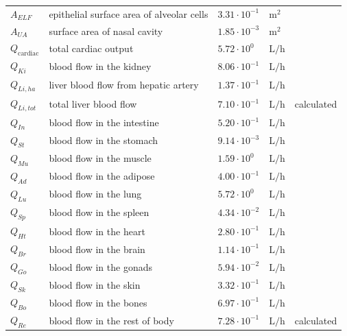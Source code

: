\documentclass[preprint,12pt,authoryear]{elsarticle}
\begin{document}
\begin{longtable}{P{2cm}P{3.5cm}P{2cm}P{1cm}P{2.5cm}}
$A_{ELF}$  & epithelial surface area of alveolar cells    & $3.31 \cdot 10^{-1}$ & $\text{m}^2$ &\citep{stone_1992} \\
$A_{UA}$  & surface area of nasal cavity    & $1.85 \cdot 10^{-3}$ & $\text{m}^2$ &\citep{oller_2010} \\

\midrule\midrule


$Q_{\text{cardiac}}$ & total cardiac output & $5.72 \cdot 10^{0}$ & $\text{L}/\text{h}$ & \citep{brown_1997} \\
$Q_{Ki}$ & blood flow in the kidney & $8.06 \cdot 10^{-1}$ & $\text{L}/\text{h}$ & \citep{brown_1997} \\
$Q_{Li,ha}$ & liver blood flow from hepatic artery & $1.37 \cdot 10^{-1}$ & $\text{L}/\text{h}$ & \citep{brown_1997} \\
$Q_{Li,tot}$ & total liver blood flow & $7.10 \cdot 10^{-1}$ & $\text{L}/\text{h}$ & calculated \\
$Q_{In}$ & blood flow in the intestine & $5.20 \cdot 10^{-1}$ & $\text{L}/\text{h}$ & \citep{badhan_2014} \\
$Q_{St}$ & blood flow in the stomach & $9.14 \cdot 10^{-3}$ & $\text{L}/\text{h}$ & \citep{badhan_2014} \\
$Q_{Mu}$ & blood flow in the muscle & $1.59 \cdot 10^{0}$ & $\text{L}/\text{h}$ & \citep{brown_1997} \\
$Q_{Ad}$ & blood flow in the adipose & $4.00 \cdot 10^{-1}$ & $\text{L}/\text{h}$ & \citep{brown_1997} \\
$Q_{Lu}$ & blood flow in the lung & $5.72 \cdot 10^{0}$ & $\text{L}/\text{h}$ & \citep{brown_1997} \\
$Q_{Sp}$ & blood flow in the spleen & $4.34 \cdot 10^{-2}$ & $\text{L}/\text{h}$ & \citep{badhan_2014} \\
$Q_{Ht}$ & blood flow in the heart & $2.80 \cdot 10^{-1}$ & $\text{L}/\text{h}$ & \citep{brown_1997} \\
$Q_{Br}$ & blood flow in the brain & $1.14 \cdot 10^{-1}$ & $\text{L}/\text{h}$ & \citep{brown_1997} \\
$Q_{Go}$ & blood flow in the gonads & $5.94 \cdot 10^{-2}$ & $\text{L}/\text{h}$ & \citep{west_1987} \\
$Q_{Sk}$ & blood flow in the skin & $3.32 \cdot 10^{-1}$ & $\text{L}/\text{h}$ & \citep{brown_1997} \\
$Q_{Bo}$ & blood flow in the bones & $6.97 \cdot 10^{-1}$ & $\text{L}/\text{h}$ & \citep{brown_1997} \\
$Q_{Re}$ & blood flow in the rest of body & $7.28 \cdot 10^{-1}$ & $\text{L}/\text{h}$ & calculated \\
\midrule\midrule


\end{longtable}
\end{document}
